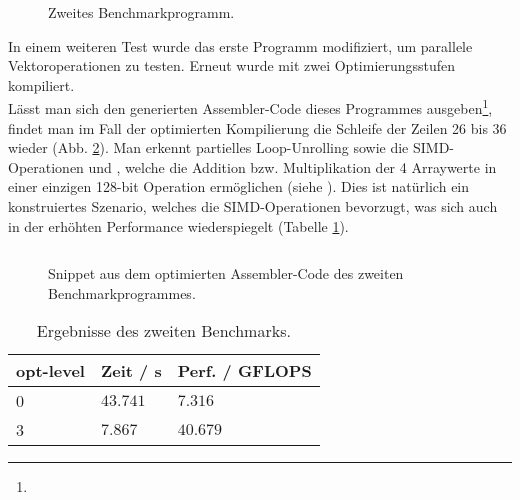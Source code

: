 \documentclass[10pt, a4paper]{article}
\begin{document}
\begin{figure}[H]
  \begin{center}
    \inputminted{rust}{./code/main2.rs}
  \end{center}
  \caption{Zweites Benchmarkprogramm.}
  \label{fig:programm3}
\end{figure}

In einem weiteren Test wurde das erste Programm modifiziert, um parallele Vektoroperationen zu testen. Erneut wurde mit zwei Optimierungsstufen kompiliert.\\

Lässt man sich den generierten Assembler-Code dieses Programmes ausgeben\footnote{ }, findet man im Fall der optimierten Kompilierung die Schleife der Zeilen 26 bis 36 wieder (Abb. \ref{fig:programm2}). Man erkennt partielles Loop-Unrolling sowie die SIMD-Operationen  und , welche die Addition bzw. Multiplikation der 4 Arraywerte in einer einzigen 128-bit Operation ermöglichen (siehe \cite{wiki_sse}). Dies ist natürlich ein konstruiertes Szenario, welches die SIMD-Operationen bevorzugt, was sich auch in der erhöhten Performance wiederspiegelt (Tabelle \ref{fig:simdm}).

\begin{figure}[h]
  \begin{center}
    \inputminted{asm}{./code/simd.s}
  \end{center}
  \caption{Snippet aus dem optimierten Assembler-Code des zweiten Benchmarkprogrammes.}
  \label{fig:programm2}
\end{figure}

\begin{table}[h]
  \centering
\begin{tabular}{|l|l|l|}
\hline
opt-level & Zeit / s & Perf. / GFLOPS \\ \hline
0         & $43.741$ & $7.316$        \\ \hline
3         & $7.867$  & $40.679$        \\ \hline
\end{tabular}
\caption{Ergebnisse des zweiten Benchmarks.}
  \label{fig:simdm}
\end{table}




\printbibheading

\begin{refsection}
\nocite{*}
\printbibliography[heading=subbibliography,title={Web}]
\end{refsection}



%
\end{document}
